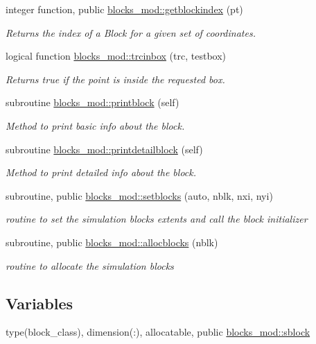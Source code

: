 \begin{DoxyCompactItemize}
integer function, public \mbox{\hyperlink{namespaceblocks__mod_a62e8fb0d6b2535b4499c7a4d848c24ba}{blocks\+\_\+mod\+::getblockindex}} (pt)
\begin{DoxyCompactList}\small\item\em Returns the index of a Block for a given set of coordinates. \end{DoxyCompactList}\item 
logical function \mbox{\hyperlink{namespaceblocks__mod_ad8d92210b3d4ade090d2a19b97f4c88e}{blocks\+\_\+mod\+::trcinbox}} (trc, testbox)
\begin{DoxyCompactList}\small\item\em Returns true if the point is inside the requested box. \end{DoxyCompactList}\item 
subroutine \mbox{\hyperlink{namespaceblocks__mod_a6eab8b323cb15dcecb5c6b0c31b4e246}{blocks\+\_\+mod\+::printblock}} (self)
\begin{DoxyCompactList}\small\item\em Method to print basic info about the block. \end{DoxyCompactList}\item 
subroutine \mbox{\hyperlink{namespaceblocks__mod_a10f356706988c45a255922fe70851488}{blocks\+\_\+mod\+::printdetailblock}} (self)
\begin{DoxyCompactList}\small\item\em Method to print detailed info about the block. \end{DoxyCompactList}\item 
subroutine, public \mbox{\hyperlink{namespaceblocks__mod_a8f5a5d9e6cfd16cfd1b179092a204696}{blocks\+\_\+mod\+::setblocks}} (auto, nblk, nxi, nyi)
\begin{DoxyCompactList}\small\item\em routine to set the simulation blocks extents and call the block initializer \end{DoxyCompactList}\item 
subroutine, public \mbox{\hyperlink{namespaceblocks__mod_a639beb0fee2290d46353f4b4702d6711}{blocks\+\_\+mod\+::allocblocks}} (nblk)
\begin{DoxyCompactList}\small\item\em routine to allocate the simulation blocks \end{DoxyCompactList}\end{DoxyCompactItemize}
\subsection*{Variables}
\begin{DoxyCompactItemize}
\item 
type(block\+\_\+class), dimension(\+:), allocatable, public \mbox{\hyperlink{namespaceblocks__mod_a13b3fc755dfbf3e333490a3f931b28aa}{blocks\+\_\+mod\+::sblock}}
\end{DoxyCompactItemize}
